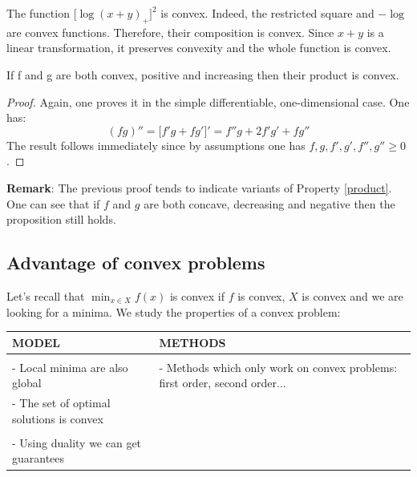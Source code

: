 \begin{example}
\begin{leftbar}
The function $\big[ \log(x+y)_+\big]^2$ is convex. Indeed, the restricted square and $-\log$ are convex functions. Therefore, their composition is convex. Since $x+y$ is a linear transformation, it preserves convexity and the whole function is convex. 
\end{leftbar}
\end{example}
\vspace{0.5cm}
\begin{property}\label{product}
If f and g are both convex, positive and increasing then their product is convex.
\end{property}
\begin{proof}
Again, one proves it in the simple differentiable, one-dimensional case. 
One has:
$$(fg)'' = \big[ f'g + fg'\big]' = f''g + 2f'g'+fg''$$
The result follows immediately since by assumptions one has $f,g,f',g',f'',g'' \geq 0$.  
\end{proof}
\textbf{Remark}: The previous proof tends to indicate variants of Property \ref{product}. One can see that if $f$ and $g$ are both concave, decreasing and negative then the proposition still holds.  

\subsection{Advantage of convex problems}
\begin{property}
Let's recall that $ \min_{x \in X} f(x)$ is convex if $f$ is convex, $X$ is convex and we are looking for a minima. We study the properties of a convex problem:
\vspace{0.5cm}
\begin{center}
 \begin{tabular}{p{7cm}|p{7cm}} 
    MODEL & METHODS \\
    \hline
	  & \\
  - Local minima are also global & - Methods which only work on convex problems: first order, second order...  \\
   - The set of optimal solutions is convex & \\
	& \\
    - Using duality we can get guarantees & \\
 \end{tabular}
 \end{center}

 \end{property}
